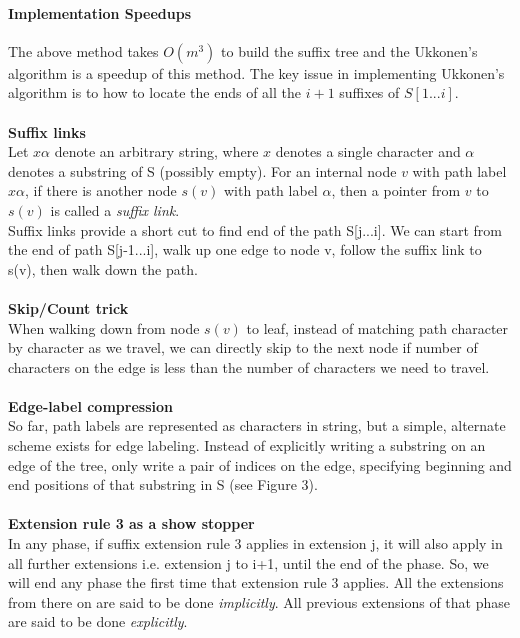 \documentclass[11pt,a4paper]{article}
\begin{document}
\paragraph{Implementation Speedups}
The above method takes \begin{math}O(m^3)\end{math} to build the suffix tree and the Ukkonen's algorithm is a speedup of this method. The key issue in implementing Ukkonen's algorithm is to how to locate the ends of all the $i+1$ suffixes of $S[1...i]$.
\\
\\
\textbf{Suffix links}
\\
Let $x\alpha$ denote an arbitrary string, where $x$ denotes a single character and $\alpha$ denotes a substring of S (possibly empty). For an internal node $v$ with path label $x\alpha$, if there is another node $s(v)$ with path label $\alpha$, then a pointer from $v$ to $s(v)$ is called a \emph{suffix link}.
\\
Suffix links provide a short cut to find end of the path S[j...i]. We can start from the end of path S[j-1...i], walk up one edge to node v, follow the suffix link to s(v), then walk down the path. 
\\
\\
\textbf{Skip/Count trick}
\\
When walking down from node \begin{math}s(v)\end{math} to leaf, instead of matching path character by character as we travel, we can directly skip to the next node if number of characters on the edge is less than the number of characters we need to travel.
\\
\\
\textbf{Edge-label compression}
\\
So far, path labels are represented as characters in string, but a simple, alternate scheme exists for edge labeling. Instead of explicitly writing a substring on an edge of the tree, only write a pair of indices on the edge, specifying beginning and end positions of that substring in S (see Figure 3).
\\
\\
\textbf{Extension rule 3 as a show stopper}
\\
In any phase, if suffix extension rule 3 applies in extension j, it will also apply in all further extensions i.e. extension j to i+1, until the end of the phase. So, we will end any phase the first time that extension rule 3 applies. All the extensions from there on are said to be done \emph{implicitly}. All previous extensions of that phase are said to be done \emph{explicitly}.
\end{document}

